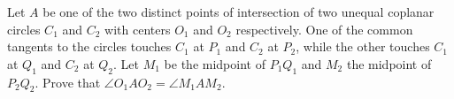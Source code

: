 Let $A$ be one of the two distinct points of intersection of two unequal coplanar circles $C_1$ and $C_2$ with centers $O_1$ and $O_2$ respectively. One of the common tangents to the circles touches $C_1$ at $P_1$ and $C_2$ at $P_2$,  while the other touches $C_1$ at $Q_1$ and $C_2$ at $Q_2$. Let $M_1$ be the midpoint of $P_1Q_1$ and $M_2$ the midpoint of $P_2Q_2$. Prove that $\angle O_1AO_2=\angle M_1AM_2$.